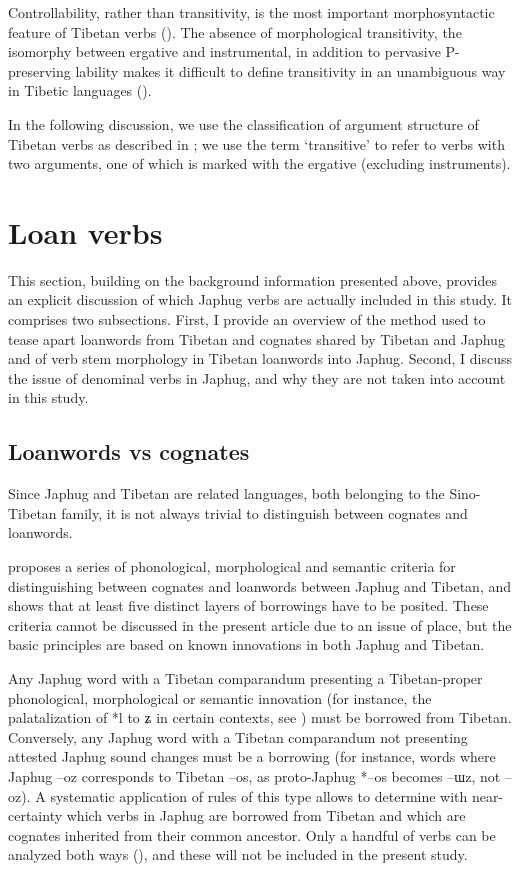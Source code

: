 \documentclass[oldfontcommands,oneside,a4paper,11pt]{article}
\newcommand{\ipa}[1]{{\phon \mbox{#1}}} %
\begin{document}
Controllability, rather than transitivity, is the most important morphosyntactic feature of Tibetan verbs (\citealt[74-5, 136]{haller04themchen}). The absence of morphological transitivity, the isomorphy between ergative and instrumental, in addition to pervasive P-preserving lability makes it difficult to define transitivity in an unambiguous way in Tibetic languages (\citealt{tournadre96erg}).

In the following discussion, we use the classification of argument structure of Tibetan verbs as described in \citet{haller04themchen}; we use the term `transitive' to refer to verbs with two arguments, one of which is marked with the ergative (excluding instruments). 


\section{Loan verbs}
This section, building on the background information presented above, provides an explicit discussion of which Japhug verbs are actually included in this study. It comprises two subsections. First, I provide an overview of the method used to tease apart loanwords from Tibetan and cognates shared by Tibetan and Japhug and of verb stem morphology in Tibetan loanwords into Japhug. Second, I discuss the issue of denominal verbs in Japhug, and why they are not taken into account in this study. 

\subsection{Loanwords vs cognates} \label{sec:layers}
Since Japhug and Tibetan are related languages, both belonging to the Sino-Tibetan family, it is not always trivial to distinguish between cognates and loanwords. 

\citet[83-200]{jacques04these} proposes a series of phonological, morphological and semantic criteria for distinguishing between cognates and  loanwords between Japhug and Tibetan, and shows that at least five distinct layers of borrowings have to be posited. These criteria cannot be discussed in the present article due to an issue of place, but the basic principles are based on known innovations in both Japhug and Tibetan. 

Any Japhug word with a Tibetan comparandum presenting a Tibetan-proper phonological, morphological or semantic innovation (for instance, the palatalization of *l to \ipa{ʑ} in certain contexts, see \citealt{hill13laterals}) must be borrowed from Tibetan. Conversely, any Japhug word with a Tibetan comparandum not presenting attested Japhug sound changes must be a borrowing (for instance, words where Japhug \ipa{--oz} corresponds to Tibetan \ipa{--os}, as proto-Japhug *\ipa{--os} becomes \ipa{--ɯz}, not \ipa{--oz}). A systematic application of rules of this type allows to determine with near-certainty which verbs in Japhug are borrowed from Tibetan and which are cognates inherited from their common ancestor. Only a handful of verbs can be analyzed both ways (\citealt[164]{jacques04these}), and these will not be included in the present study.
\end{document}
